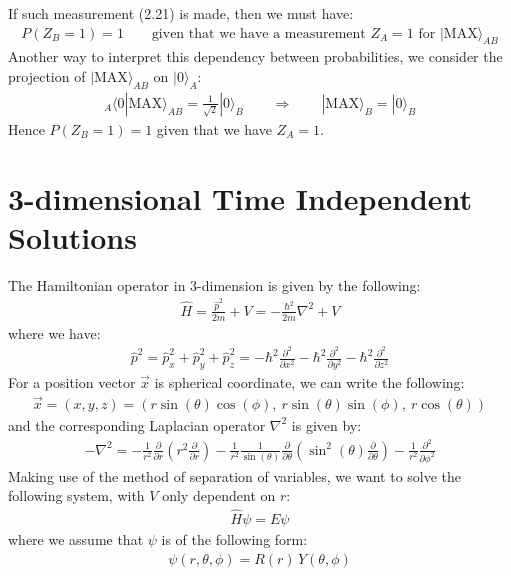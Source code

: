 \documentclass[11pt]{book}
\theoremstyle{break}
\theoremstyle{break}
\newcommand{\pd}{\partial}
\begin{document}
If such measurement (2.21) is made, then we must have:
\begin{align*}
P(Z_B = 1) = 1 \qquad \text{given that we have a measurement }Z_A = 1 \text{ for }|\text{MAX}\rangle_{AB}
\end{align*}
Another way to interpret this dependency between probabilities, we consider the projection of $|\text{MAX}\rangle_{AB}$ on $|0\rangle_A$:
\begin{align*}
_A\langle 0 | \text{MAX}\rangle_{AB} = \frac{1}{\sqrt{2}}|0\rangle_B \qquad\Rightarrow \qquad |\text{MAX}\rangle_B = |0 \rangle_B 
\end{align*}
Hence $P(Z_B=1) = 1$ given that we have $Z_A=1$.



\newpage
\section[3-dimensional Time Independent Solutions]{\color{red}3-dimensional  Time Independent Solutions\color{black}}
The Hamiltonian operator in $3$-dimension is given by the following:
\begin{align*}
\hat{H } = \frac{\hat{p}^2}{2m} + V = -\frac{\hbar^2}{2m}\nabla^2 +V
\end{align*}
where we have:
\begin{align*}
\hat{p}^2 = \hat{p}_x^2 + \hat{p}_y^2 + \hat{p}_z^2 = -\hbar^2\frac{\pd^2}{\pd x^2} - \hbar^2\frac{\pd^2}{\pd y^2} - \hbar^2\frac{\pd^2}{\pd z^2}
\end{align*}
For a position vector $\vec{x}$ is spherical coordinate, we can write the following:
\begin{align*}
\vec{x} = (x,y,z) = \left(r\sin(\theta) \cos(\phi), \ r\sin(\theta) \sin(\phi),\ r\cos(\theta) \right)
\end{align*}
and the corresponding Laplacian operator $\nabla^2$ is given by:
\begin{align*}
-\nabla^2 = -\frac{1}{r^2}\frac{\pd}{\pd r}\left( r^2 \frac{\pd}{\pd r}\right)  - \frac{1}{r^2}\frac{1}{\sin(\theta)}\frac{\pd}{\pd \theta}\left( \sin^2(\theta) \frac{\pd}{\pd \theta}\right) - \frac{1}{r^2}\frac{\pd^2}{\pd \phi^2}
\end{align*}
Making use of the method of separation of variables, we want to solve the following system, with $V$ only dependent on $r$:
\begin{align}
\hat{H}\psi = E\psi
\end{align}
where we assume that $\psi$ is of the following form:
\begin{align*}
\psi(r,\theta,\phi) = R(r)\, Y( \theta, \phi)
\end{align*}
\end{document}
